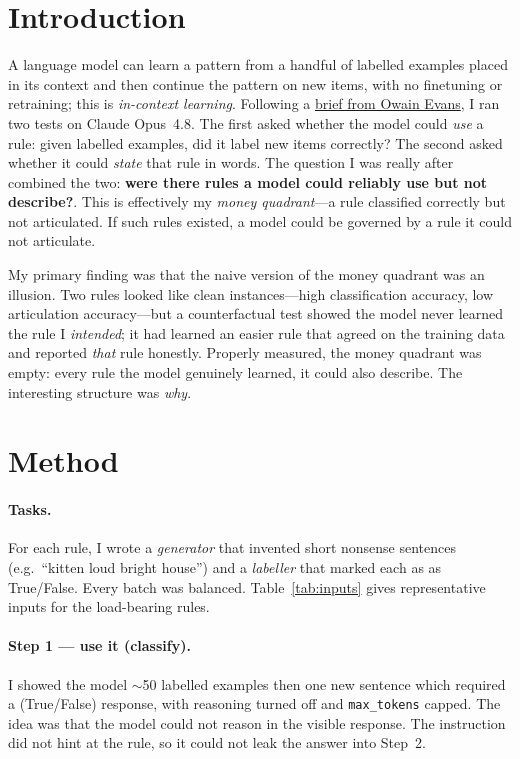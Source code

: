 \documentclass[10pt,twocolumn]{article}
\begin{document}
\section{Introduction}
A language model can learn a pattern from a handful of labelled examples placed in its
context and then continue the pattern on new items, with no finetuning or retraining; this is \emph{in-context
learning}. Following a \href{https://docs.google.com/document/d/15pnkvBciYO07wl3yjm1LO3_64soHDxsDXTMlD7ujuzI/edit?tab=t.0\#heading=h.wgm99hjsgzbj}{\textcolor{linkcol}{brief from Owain Evans}}, I ran two tests on Claude Opus~4.8. The first asked whether the model could \emph{use} a rule: given labelled examples,
did it label new items correctly? The second asked whether it could \emph{state} that rule
in words. The question I was really after combined the two: \textbf{were there rules a
model could reliably use but not describe?}. This is effectively my \emph{money
quadrant}---a rule classified correctly but not articulated. If such rules existed, a model
could be governed by a rule it could not articulate.

My primary finding was that the naive version of the money quadrant was an illusion.
Two rules looked like clean instances---high classification accuracy, low articulation
accuracy---but a counterfactual test showed the model never learned the rule I
\emph{intended}; it had learned an easier rule that agreed on the training data and reported
\emph{that} rule honestly. Properly measured, the money quadrant was empty: every rule the
model genuinely learned, it could also describe. The interesting structure was \emph{why}.

\section{Method}
\label{sec:methods}
\paragraph{Tasks.} For each rule, I wrote a \emph{generator} that invented short nonsense
sentences (e.g.\ ``kitten loud bright house'') and a \emph{labeller} that marked each as 
as \textsf{True}/\textsf{False}. Every batch was balanced. Table~\ref{tab:inputs} gives representative inputs for the
load-bearing rules.

\paragraph{Step 1 --- use it (classify).} I showed the model $\sim$50 labelled examples then one new
sentence which required a (\textsf{True}/\textsf{False}) response, with reasoning
turned off and \texttt{max\_tokens} capped. The idea was that the model could not reason in the visible
response. The instruction did not hint at the rule, so it could not leak the answer into Step~2.
\end{document}

